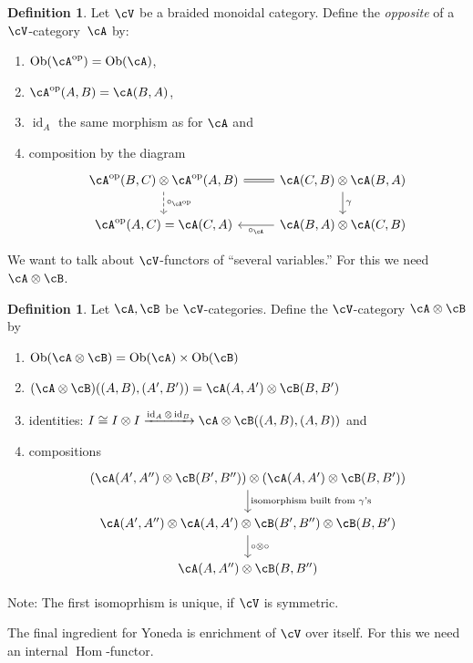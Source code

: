 \documentclass[a4paper,11pt,oneside,openany]{scrbook}
\newcommand{\iso}{\cong}
\DeclareMathOperator{\Hom}{\text{Hom}}
\DeclareMathOperator{\op}{\text{op}}
\DeclareMathOperator{\id}{id}
\DeclareMathOperator{\Ob}{Ob}
\theoremstyle{definition}
\theoremstyle{definition}
\newtheorem{defn}[thm]{Definition} %
\begin{document}
\begin{defn}
    Let $ \cV $ be a braided monoidal category.
    Define the \emph{opposite} of a $ \cV $-category~$ \cA $ by:
    \begin{enumerate}[label=$\bullet$]
	\item $ \Ob(\cA^{\op}) = \Ob(\cA) $,
	\item $ \cA^{\op}(A,B) = \cA(B,A) $,
	\item $ \id_A $ the same morphism as for $ \cA $ and
	\item composition by the diagram
	    \begin{displaymath}
	        \begin{tikzcd}
		    \cA^{\op}(B,C)\otimes \cA^{\op}(A,B)\arrow[r, equal] \arrow[d, dashed, "\circ_{\cA^{\op}}"]& \cA(C,B)\otimes \cA(B,A) \arrow[d, "\gamma"] \\
		    \cA^{\op}(A,C) = \cA(C,A) & \cA(B,A)\otimes \cA(C,B) \arrow[l, "\circ_\cA"]
	        \end{tikzcd}
	    \end{displaymath}
    \end{enumerate}
\end{defn}
We want to talk about $ \cV $-functors of ``several variables.''
For this we need $ \cA \otimes \cB$.
\begin{defn}
    Let $ \cA,\cB $ be $ \cV $-categories.
    Define the $ \cV $-category $ \cA \otimes \cB $ by
    \begin{enumerate}[label=$ \bullet $]
	\item $ \Ob(\cA\otimes \cB) = \Ob(\cA) \times \Ob(\cB) $
	\item $ (\cA\otimes\cB)((A,B),(A',B')) = \cA(A,A')\otimes \cB(B,B') $
	\item identities: $ I \iso I\otimes I \xrightarrow{\id_A \otimes \id_B} \cA\otimes\cB((A,B),(A,B)) $ and
	\item compositions
	    \begin{displaymath}
	        \begin{tikzcd}
		    (\cA(A',A'') \otimes \cB(B',B'')) \otimes (\cA(A,A') \otimes \cB(B,B'))
		    \arrow[d, "\text{isomorphism built from $ \gamma $'s}"]
		    \\
		    \cA(A',A'') \otimes \cA(A,A')\otimes \cB(B',B'')\otimes \cB(B,B')
		    \arrow[d, "\circ\otimes\circ"]\\
		    \cA(A,A'')\otimes \cB(B,B'')
	        \end{tikzcd}
	    \end{displaymath}
    \end{enumerate}
    Note: The first isomoprhism is unique, if $ \cV $ is symmetric.
\end{defn}
The final ingredient for Yoneda is enrichment of $ \cV $ over itself.
For this we need an internal $ \Hom $-functor.
\end{document}
